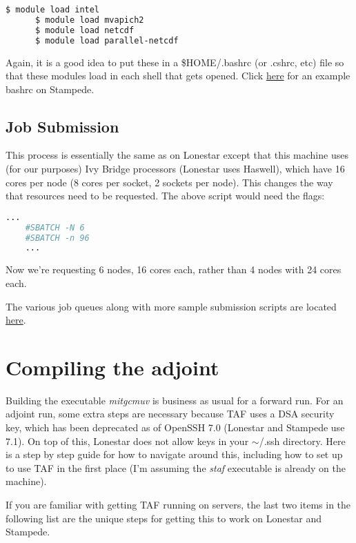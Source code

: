 \documentclass[a4paper,11pt]{article}
\begin{document}
	\begin{lstlisting}[language=bash]
	  $ module load intel
	  $ module load mvapich2
	  $ module load netcdf
	  $ module load parallel-netcdf
	\end{lstlisting}

	Again, it is a good idea to put these in a \$HOME/.bashrc (or .cshrc, etc) file so that these modules load in each shell that gets opened. Click \href{http://users.ices.utexas.edu/~tsmith/bash-scripts/bashrc_tsmith_stampede}{here} for an example bashrc on Stampede.


	\subsection{Job Submission}

	This process is essentially the same as on Lonestar except that this machine uses (for our purposes) Ivy Bridge processors (Lonestar uses Haswell), which have 16 cores per node (8 cores per socket, 2 sockets per node). This changes the way that resources need to be requested. The above script would need the flags: 

	\begin{lstlisting}[language=bash]
	...
	#SBATCH -N 6
	#SBATCH -n 96
	...

	\end{lstlisting} 

	Now we're requesting 6 nodes, 16 cores each, rather than 4 nodes with 24 cores each. 

	The various job queues along with more sample submission scripts are located \href{https://portal.tacc.utexas.edu/user-guides/stampede#running}{here}.  

	\section{Compiling the adjoint} 
	Building the executable \textit{mitgcmuv} is business as usual for a forward run. For an adjoint run, some extra steps are necessary because TAF uses a DSA security key, which has been deprecated as of OpenSSH 7.0 (Lonestar and Stampede use 7.1). On top of this, Lonestar does not allow keys in your $\sim$/.ssh directory. Here is a step by step guide for how to navigate around this, including how to set up to use TAF in the first place (I'm assuming the \textit{staf} executable is already on the machine). 

	If you are familiar with getting TAF running on servers, the last two items in the following list are the unique steps for getting this to work on Lonestar and Stampede.
\end{document}
